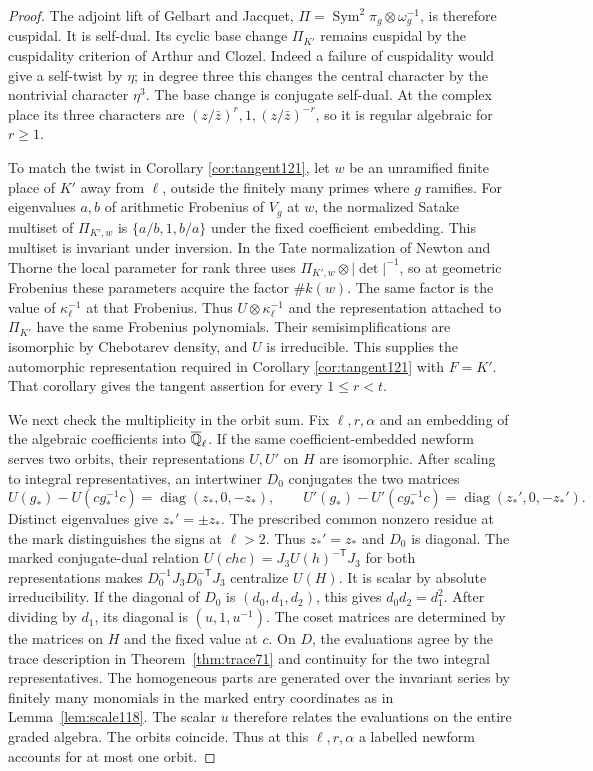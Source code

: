 \documentclass[a4paper,11pt]{article}
\theoremstyle{definition}
\theoremstyle{remark}
\numberwithin{equation}{section}
\begin{document}
\begin{proof}
The adjoint lift of Gelbart and Jacquet,
\(\Pi=\operatorname{Sym}^2\pi_g\otimes\omega_g^{-1}\),
is therefore cuspidal. It is self-dual. Its cyclic base
change \(\Pi_{K'}\) remains cuspidal by the cuspidality
criterion of Arthur and Clozel. Indeed a failure of cuspidality
would give a self-twist by \(\eta\); in degree three this
changes the central character by the nontrivial character
\(\eta^3\). The base change is conjugate self-dual. At the
complex place its three characters are
\((z/\bar z)^r,1,(z/\bar z)^{-r}\), so it is regular
algebraic for \(r\ge1\).~\cite{VI-IV-I-gj123,VI-IV-I-ac123}

To match the twist in Corollary \ref{cor:tangent121}, let \(w\) be an
unramified finite place of \(K'\) away from \(\ell\), outside
the finitely many primes where \(g\) ramifies. For eigenvalues
\(a,b\) of arithmetic Frobenius of \(V_g\) at \(w\), the
normalized Satake multiset of \(\Pi_{K',w}\) is
\(\{a/b,1,b/a\}\) under the fixed coefficient embedding.
This multiset is invariant under inversion. In the Tate
normalization of Newton and Thorne the local parameter for
rank three uses \(\Pi_{K',w}\otimes|\det|^{-1}\), so at
geometric Frobenius these parameters acquire the factor
\(\#k(w)\). The same factor is the value of
\(\kappa_\ell^{-1}\) at that Frobenius. Thus
\(U\otimes\kappa_\ell^{-1}\) and the representation attached
to \(\Pi_{K'}\) have the same Frobenius polynomials. Their
semisimplifications are isomorphic by Chebotarev density, and
\(U\) is irreducible. This supplies the automorphic
representation required in Corollary \ref{cor:tangent121} with
\(F=K'\). That corollary gives the tangent assertion for
every \(1\le r<t\).~\cite{VI-IV-I-nt123}

We next check the multiplicity in the orbit sum. Fix
\(\ell,r,\alpha\) and an embedding of the algebraic
coefficients into \(\overline{\mathbb Q}_\ell\). If the same
coefficient-embedded newform serves two orbits, their
representations \(U,U'\) on \(H\) are isomorphic. After
scaling to integral representatives, an intertwiner \(D_0\)
conjugates the two matrices
\[
    U(g_*)-U(cg_*^{-1}c)=\operatorname{diag}(z_*,0,-z_*),
    \qquad
    U'(g_*)-U'(cg_*^{-1}c)=\operatorname{diag}(z_*',0,-z_*').
\]
Distinct eigenvalues give \(z_*'=\pm z_*\). The prescribed
common nonzero residue at the mark distinguishes the signs
at \(\ell>2\). Thus \(z_*'=z_*\) and \(D_0\) is diagonal.
The marked conjugate-dual relation
\(U(chc)=J_3U(h)^{-\mathsf T}J_3\) for both representations
makes \(D_0^{-1}J_3D_0^{-\mathsf T}J_3\) centralize \(U(H)\).
It is scalar by absolute irreducibility. If the diagonal of
\(D_0\) is \((d_0,d_1,d_2)\), this gives \(d_0d_2=d_1^2\).
After dividing by \(d_1\), its diagonal is \((u,1,u^{-1})\).
The coset matrices are determined by the matrices on \(H\)
and the fixed value at \(c\). On \(D\), the evaluations
agree by the trace description in Theorem~\ref{thm:trace71}
and continuity for the two integral representatives. The
homogeneous parts are generated over the invariant series
by finitely many monomials in the marked entry coordinates
as in Lemma~\ref{lem:scale118}. The scalar \(u\) therefore
relates the evaluations on the entire graded algebra. The
orbits coincide. Thus at this \(\ell,r,\alpha\) a labelled
newform accounts for at most one orbit.


\end{proof}
\end{document}
